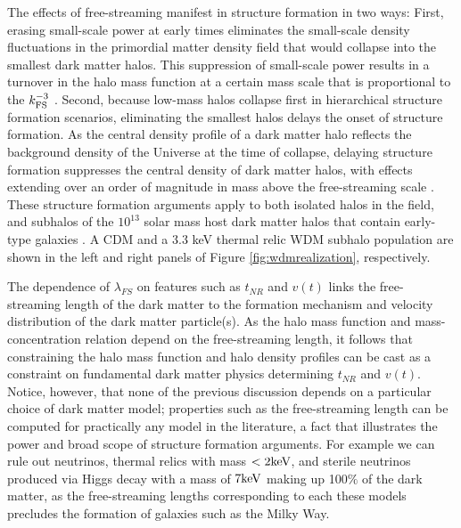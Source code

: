 The effects of free-streaming manifest in structure formation in two ways: First, erasing small-scale power at early times eliminates the small-scale density fluctuations in the primordial matter density field that would collapse into the smallest dark matter halos. This suppression of small-scale power results in a turnover in the halo mass function at a certain mass scale that is proportional to the $k_{\rm{FS}}^{-3}$ \cite{AvilaReese++01,Schneider++12,Lovell++14}. Second, because low-mass halos collapse first in hierarchical structure formation scenarios, eliminating the smallest halos delays the onset of structure formation. As the central density profile of a dark matter halo reflects the background density of the Universe at the time of collapse, delaying structure formation suppresses the central density of dark matter halos, with effects extending over an order of magnitude in mass above the free-streaming scale \cite{Navarro++96,Bose++16}. These structure formation arguments apply to both isolated halos in the field, and subhalos of the $10^{13}$ solar mass host dark matter halos that contain early-type galaxies \cite{Gavazzi++07}. A CDM and a 3.3 keV thermal relic WDM subhalo population are shown in the left and right panels of Figure \ref{fig:wdmrealization}, respectively. 

The dependence of $\lambda_{FS}$ on features such as $t_{NR}$ and $v\left(t\right)$ links the free-streaming length of the dark matter to the formation mechanism and velocity distribution of the dark matter particle(s). As the halo mass function and mass-concentration relation depend on the free-streaming length, it follows that constraining the halo mass function and halo density profiles can be cast as a constraint on fundamental dark matter physics determining $t_{NR}$ and $v\left(t\right)$. Notice, however, that none of the previous discussion depends on a particular choice of dark matter model; properties such as the free-streaming length can be computed for practically any model in the literature, a fact that illustrates the power and broad scope of structure formation arguments. For example we can rule out neutrinos, thermal relics with mass $< 2 \rm{keV}$, and sterile neutrinos produced via Higgs decay with a mass of $7 \rm{keV}$ \cite{Viel13,AbazaijanKusenko19} making up 100$\%$ of the dark matter, as the free-streaming lengths corresponding to each these models precludes the formation of galaxies such as the Milky Way. 

